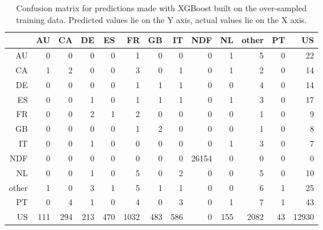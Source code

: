 \documentclass{article}
\begin{document}
\begin{table}[ht]
\centering
\begin{tabular}{r | rrrrrrrrrrrr}
 & AU & CA & DE & ES & FR & GB & IT & NDF & NL & other & PT & US \\
  \hline
  AU &   0 &   0 &   0 &   0 &   1 &   0 &   0 &   0 &   1 &   5 &   0 &  22 \\ 
  CA &   1 &   2 &   0 &   0 &   3 &   0 &   1 &   0 &   1 &   2 &   0 &  14 \\ 
  DE &   0 &   0 &   0 &   0 &   1 &   1 &   1 &   0 &   0 &   4 &   0 &  14 \\ 
  ES &   0 &   0 &   1 &   0 &   1 &   1 &   1 &   0 &   1 &   3 &   0 &  17 \\ 
  FR &   0 &   0 &   2 &   1 &   2 &   0 &   0 &   0 &   0 &   1 &   0 &   9 \\ 
  GB &   0 &   0 &   0 &   0 &   1 &   2 &   0 &   0 &   0 &   1 &   0 &   8 \\ 
  IT &   0 &   0 &   1 &   0 &   0 &   0 &   0 &   0 &   1 &   3 &   0 &   7 \\ 
  NDF &   0 &   0 &   0 &   0 &   0 &   0 &   0 & 26154 &   0 &   0 &   0 &   0 \\ 
  NL &   0 &   0 &   1 &   0 &   5 &   0 &   2 &   0 &   0 &   5 &   0 &  10 \\ 
  other &   1 &   0 &   3 &   1 &   5 &   1 &   1 &   0 &   0 &   6 &   1 &  25 \\ 
  PT &   0 &   4 &   1 &   0 &   4 &   0 &   3 &   0 &   1 &   7 &   1 &  43 \\ 
  US & 111 & 294 & 213 & 470 & 1032 & 483 & 586 &   0 & 155 & 2082 &  43 & 12930 \\ 
\end{tabular}
\caption{Confusion matrix for predictions made with XGBoost built on the over-sampled training data. Predicted values lie on the Y axis, actual values lie on the X axis.}
\label{cm:over_sampled}
\end{table}

\end{document}

